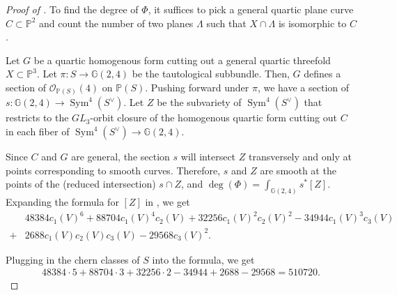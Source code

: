 \documentclass{article}
\theoremstyle{definition}
\newtheorem{exmp}[thm]{Example}
\newtheorem{rmk}[thm]{Remark}
\newcommand{\on}{\operatorname}
\newcommand{\mb}{\mathbb}
\newcommand{\ms}{\mathscr}
\begin{document}
\begin{comment}
\begin{rmk}
One can replace the condition that $F$ is general with the more specific condition that $F$ cuts out a smooth quartic in $\mb{P}^2$ with general flex behavior and has no nontrivial automorphisms in \Cref{quarticthom} \cite{AF93}. 
\end{rmk}
\begin{exmp}
If $u,v,w$ are the chern roots of $V$ and if $P(u,v,w)$ is the above formula for the class of $Z$ in terms of chern roots, then $P(u-\frac{H}{4},v-\frac{H}{4},w-\frac{H}{4})$ is the class of the projectivization of $Z$ in $\mb{P}(\on{Sym}^4V^{\vee})$ \cite[Theorem 6.1]{FNR05}, where $H$ is $\ms{O}_{\mb{P}(\on{Sym}^4V^{\vee})}(1)$. Under this substitution, the leading term is $14280H^6$, agreeing with the degree of an orbit closure of a general quartic curve computed by Aluffi and Faber\cite{AF93}. 
\end{exmp}
\end{comment}

\begin{proof}[Proof of ]
To find the degree of $\Phi$, it suffices to pick a general quartic plane curve $C\subset \mb{P}^2$ and count the number of two planes $\Lambda$ such that $X\cap \Lambda$ is isomorphic to $C$. 

Let $G$ be a quartic homogenous form cutting out a general quartic threefold $X\subset \mb{P}^3$. Let $\pi: S\to \mb{G}(2,4)$ be the tautological subbundle. Then, $G$ defines a section of $\ms{O}_{\mb{P}(S)}(4)$ on $\mb{P}(S)$. Pushing forward under $\pi$, we have a section of $s: \mb{G}(2,4)\to \on{Sym}^4(S^{\vee})$. Let $Z$ be the subvariety of $\on{Sym}^4(S^{\vee})$ that restricts to the $GL_3$-orbit closure of the homogenous quartic form cutting out $C$ in each fiber of $\on{Sym}^4(S^{\vee})\to \mb{G}(2,4)$. 

Since $C$ and $G$ are general, the section $s$ will intersect $Z$ transversely and only at points corresponding to smooth curves. Therefore, $s$ and $Z$ are smooth at the points of the (reduced intersection) $s\cap Z$, and $\deg(\Phi)=\int_{\mb{G}(2,4)}s^{*}[Z]$.
Expanding the formula for $[Z]$ in , we get
\begin{align*}
    &48384 c_{1}(V)^6 + 88704 c_{1}(V)^4 c_{2}(V) + 32256 c_{1}(V)^2 c_{2}(V)^2 - 34944 c_{1}(V)^3 c_{3}(V)\\ + 
 &2688 c_{1}(V) c_{2}(V) c_{3}(V) - 29568 c_{3}(V)^2.
\end{align*}

Plugging in the chern classes of $S$ into the formula, we get
\begin{align*}
    48384 \cdot 5 + 88704 \cdot 3 + 32256 \cdot 2 - 34944 + 2688 - 29568 = 510720. 
\end{align*}
\end{proof}
\end{document}
